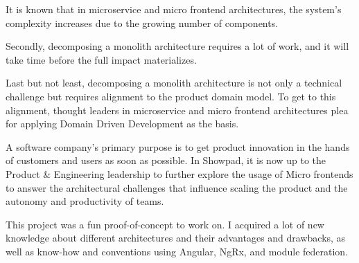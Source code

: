 It is known that in microservice and micro frontend architectures, the system's complexity increases due to the growing number of components. 

Secondly, decomposing a monolith architecture requires a lot of work, and it will take time before the full impact materializes. 

Last but not least, decomposing a monolith architecture is not only a technical challenge but requires alignment to the product domain model. To get to this alignment, thought leaders in microservice and micro frontend architectures plea for applying Domain Driven Development as the basis.

A software company's primary purpose is to get product innovation in the hands of customers and users as soon as possible. In Showpad, it is now up to the Product \& Engineering leadership to further explore the usage of Micro frontends to answer the architectural challenges that influence scaling the product and the autonomy and productivity of teams.

This project was a fun proof-of-concept to work on. I acquired a lot of new knowledge about different architectures and their advantages and drawbacks, as well as know-how and conventions using Angular, NgRx, and module federation.
